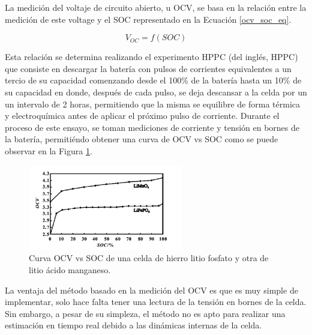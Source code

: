 \documentclass[10pt,a4paper]{article}
\newcounter{subsubsubsection}[subsubsection]
\begin{document}
\label{ocv_section}

\noindent La medici\'on del voltaje de circuito abierto, u \acrshort{OCV}, se
basa en la relaci\'on entre la medici\'on de este voltage y el \acrshort{SOC}
representado en la Ecuaci\'on \ref{ocv_soc_eq}.

\begin{equation}
    V_{OC} = f(SOC) \label{ocv_soc_eq}
\end{equation}

\noindent Esta relaci\'on se determina realizando el experimento \acrshort{HPPC} 
(del ingl\'es, \acrlong{HPPC}) que consiste en descargar la bater\'ia con pulsos 
de corrientes equivalentes a un tercio de su capacidad comenzando desde el 
100\% de la bater\'ia hasta un 10\% de su capacidad en donde, despu\'es de cada 
pulso, se deja descansar a la celda por un un intervalo de 2 horas, permitiendo 
que la misma se equilibre de forma t\'ermica y electroqu\'imica antes de aplicar 
el pr\'oximo pulso de corriente. Durante el proceso de este ensayo, se toman 
mediciones de corriente y tensi\'on en bornes de la bater\'ia, permiti\'endo 
obtener una curva de \acrshort{OCV} vs \acrshort{SOC} como se puede observar en 
la Figura \ref{soc_ocv_paper}.

\begin{figure}[h!]
    \begin{center}
        \includegraphics[width=0.6\textwidth]{soc_ocv_paper.png}
        \caption{Curva \acrshort{OCV} vs \acrshort{SOC} de una celda de hierro
        litio fosfato y otra de litio \'acido manganeso.}
        \label{soc_ocv_paper}
    \end{center}
\end{figure}

\noindent La ventaja del m\'etodo basado en la medici\'on del \acrshort{OCV} es
que es muy simple de implementar, solo hace falta tener una lectura de la
tensi\'on en bornes de la celda. Sin embargo, a pesar de su simpleza, el
m\'etodo no es apto para realizar una estimaci\'on en tiempo real debido a las
din\'amicas internas de la celda.
\end{document}

